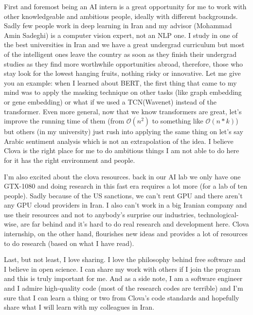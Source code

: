 \documentclass[11pt, a4paper]{awesome-cv}
\begin{document}
\begin{cvletter}
First and foremost being an AI intern is a great opportunity for me to work with other knowledgeable and ambitious people, ideally with different backgrounds. Sadly few people work in deep learning in Iran and my advisor (Mohammad Amin Sadeghi) is a computer vision expert, not an NLP one. I study in one of the best universities in Iran and we have a great undergrad curriculum but most of the intelligent ones leave the country as soon as they finish their undergrad studies as they find more worthwhile opportunities abroad, therefore, those who stay look for the lowest hanging fruits, nothing risky or innovative. Let me give you an example: when I learned about BERT, the first thing that came to my mind was to apply the masking technique on other tasks (like graph embedding or gene embedding) or what if we used a TCN(Wavenet) instead of the transformer. Even more general, now that we know transformers are great, let’s improve the running time of them (from $\mathcal{O}(n^{2})$ to something like $\mathcal{O}(n*k)$) but others (in my university) just rush into applying the same thing on let’s say Arabic sentiment analysis which is not an extrapolation of the idea. I believe Clova is the right place for me to do ambitious things I am not able to do here for it has the right environment and people. 

I’m also excited about the clova resources. back in our AI lab we only have one GTX-1080 and doing research in this fast era requires a lot more (for a lab of ten people). Sadly because of the US sanctions, we can’t rent GPU and there aren’t any GPU cloud providers in Iran. I also can’t work in a big Iranian company and use their resources and not to anybody’s surprise our industries, technological-wise, are far behind and it’s hard to do real research and development here. Clova internship, on the other hand, flourishes new ideas and provides a lot of resources to do research (based on what I have read).

\newpage

Last, but not least, I love sharing. I love the philosophy behind free software and I believe in open science. I can share my work with others if I join the program and this is truly important for me. And as a side note, I am a software engineer and I admire high-quality code (most of the research codes are terrible) and I’m sure that I can learn a thing or two from Clova's code standards and hopefully share what I will learn with my colleagues in Iran.


\end{cvletter}
\end{document}
